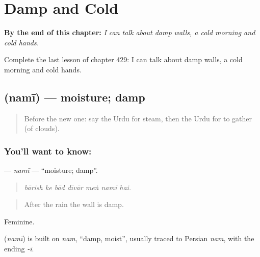 
\chapter{Damp and Cold}
\label{ch:ur-damp-and-cold}

\begin{chapteropening}
\textbf{By the end of this chapter:} \emph{I can talk about damp walls, a cold morning and cold hands.}

Complete the last lesson of chapter 429: I can talk about damp walls, a cold morning and cold hands.
\end{chapteropening}

\section[\texorpdfstring{\ur{نمی} (namī)}{نمی (namī)}]{ (namī) — moisture; damp}

\label{lesson:UR-C429-nami}



\begin{quote}
Before the new one: say the Urdu for steam, then the Urdu for to gather (of clouds).
\end{quote}

\subsection*{You'll want to know: }
\textbf{} — \emph{namī} — \textquotedblleft{}moisture; damp\textquotedblright{}.

\begin{quote}
      
\end{quote}

\begin{quote}
\emph{bārish ke bād dīvār meṅ namī hai.}
\end{quote}

\begin{quote}
After the rain the wall is damp.
\end{quote}

Feminine.

\begin{cousinweb}
\textbf{} (\emph{namī}) is built on \emph{nam}, \textquotedblleft{}damp, moist\textquotedblright{}, usually traced to Persian \emph{nam}, with the ending \emph{-ī}.
\end{cousinweb}

